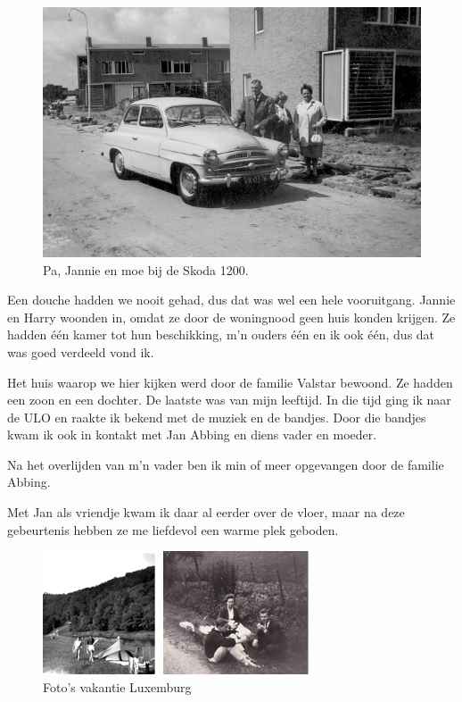 \documentclass[12pt,twoside, openright]{memoir}
\begin{document}
\begin{figure}
\includegraphics[width=\textwidth]{img/ch21/skoda}
\caption*{\footnotesize Pa, Jannie en moe bij de Skoda 1200.}
\end{figure}

Een douche hadden we nooit gehad, dus dat was wel een hele vooruitgang. Jannie en Harry woonden in, omdat ze door de woningnood geen huis konden krijgen. Ze hadden één kamer tot hun beschikking, m’n ouders één en ik ook één, dus dat was goed verdeeld vond ik. 

Het huis waarop we hier kijken werd door de familie Valstar bewoond. Ze hadden een zoon en een dochter. De laatste was van mijn leeftijd. In die tijd ging ik naar de ULO en raakte ik bekend met de muziek en de bandjes. Door die bandjes kwam ik ook in kontakt met Jan Abbing en diens vader en moeder. 

Na het overlijden van m’n vader ben ik min of meer opgevangen door de familie Abbing. 

Met Jan als vriendje kwam ik daar al eerder over de vloer, maar na deze gebeurtenis hebben ze me liefdevol een warme plek geboden.

\begin{figure}
\includegraphics[width=\textwidth]{img/ch21/luxvak}
\caption*{\footnotesize Foto’s vakantie Luxemburg}
\end{figure}
\end{document}
